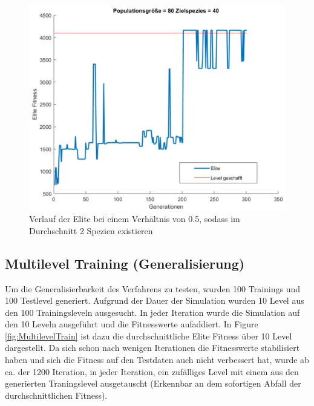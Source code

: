 \documentclass{hbrs-ecta-report}
\begin{document}
\begin{figure}[h!]
\centering
\includegraphics[width=\linewidth]{img/Mario_80_Netze_target_40.png}
\caption{Verlauf der Elite bei einem Verhältnis von 0.5, sodass im Durchschnitt 2 Spezien existieren}
\label{fig:Verhaeltniss0_5} 
\end{figure}

\FloatBarrier

\subsection{Multilevel Training (Generalisierung)}
Um die Generalisierbarkeit des Verfahrens zu testen, wurden 100 Trainings und 100 Testlevel generiert.
Aufgrund der Dauer der Simulation wurden 10 Level aus den 100 Trainingsleveln ausgesucht. In jeder Iteration wurde die Simulation auf den 10 Leveln ausgeführt und die Fitnesswerte aufaddiert. \newline In Figure \ref{fig:MultilevelTrain} ist dazu die durchschnittliche Elite Fitness über 10 Level dargestellt.
Da sich schon nach wenigen Iterationen die Fitnesswerte stabilisiert haben und sich die Fitness auf den Testdaten auch nicht verbessert hat, wurde ab ca. der  1200 Iteration, in jeder Iteration, ein zufälliges Level mit einem aus den generierten Traningslevel ausgetauscht (Erkennbar an dem sofortigen Abfall der durchschnittlichen Fitness). \newline
\end{document}
